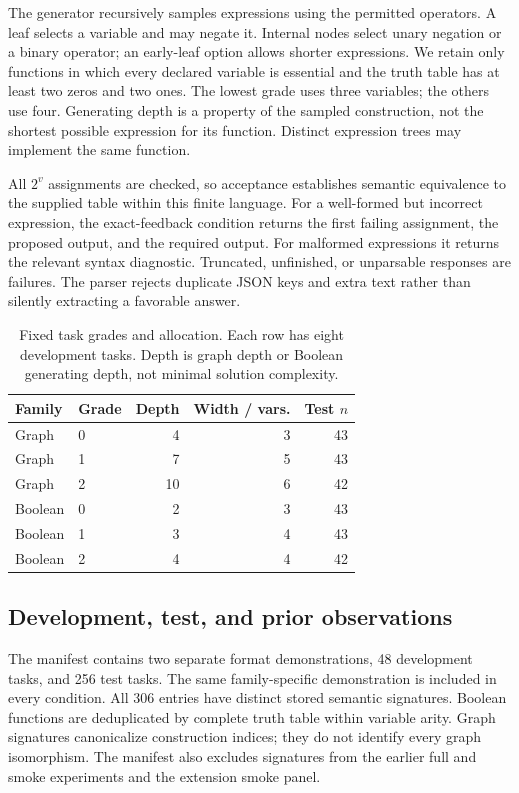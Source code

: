 The generator recursively samples expressions using the permitted operators. A leaf selects a variable and may negate it. Internal nodes select unary negation or a binary operator; an early-leaf option allows shorter expressions. We retain only functions in which every declared variable is essential and the truth table has at least two zeros and two ones. The lowest grade uses three variables; the others use four. Generating depth is a property of the sampled construction, not the shortest possible expression for its function. Distinct expression trees may implement the same function.

All $2^v$ assignments are checked, so acceptance establishes semantic equivalence to the supplied table within this finite language. For a well-formed but incorrect expression, the exact-feedback condition returns the first failing assignment, the proposed output, and the required output. For malformed expressions it returns the relevant syntax diagnostic. Truncated, unfinished, or unparsable responses are failures. The parser rejects duplicate JSON keys and extra text rather than silently extracting a favorable answer.

\begin{table}[t]
\caption{Fixed task grades and allocation. Each row has eight development tasks. Depth is graph depth or Boolean generating depth, not minimal solution complexity.}
\label{tab:tasks}
\centering\small
\begin{tabular}{llrrr}
\toprule
Family & Grade & Depth & Width / vars. & Test $n$\\
\midrule
Graph & 0 & 4 & 3 & 43\\
Graph & 1 & 7 & 5 & 43\\
Graph & 2 & 10 & 6 & 42\\
Boolean & 0 & 2 & 3 & 43\\
Boolean & 1 & 3 & 4 & 43\\
Boolean & 2 & 4 & 4 & 42\\
\bottomrule
\end{tabular}
\end{table}

\subsection{Development, test, and prior observations}

The manifest contains two separate format demonstrations, 48 development tasks, and 256 test tasks. The same family-specific demonstration is included in every condition. All 306 entries have distinct stored semantic signatures. Boolean functions are deduplicated by complete truth table within variable arity. Graph signatures canonicalize construction indices; they do not identify every graph isomorphism. The manifest also excludes signatures from the earlier full and smoke experiments and the extension smoke panel.

